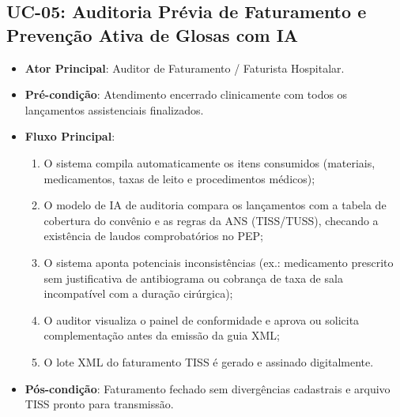 \documentclass[12pt,oneside,a4paper,article]{abntex2}
\begin{document}
\subsection{UC-05: Auditoria Prévia de Faturamento e Prevenção Ativa de Glosas com IA}
\begin{itemize}[noitemsep]
  \item \textbf{Ator Principal}: Auditor de Faturamento / Faturista Hospitalar.
  \item \textbf{Pré-condição}: Atendimento encerrado clinicamente com todos os lançamentos assistenciais finalizados.
  \item \textbf{Fluxo Principal}:
  \begin{enumerate}[noitemsep]
    \item O sistema compila automaticamente os itens consumidos (materiais, medicamentos, taxas de leito e procedimentos médicos);
    \item O modelo de IA de auditoria compara os lançamentos com a tabela de cobertura do convênio e as regras da ANS (TISS/TUSS), checando a existência de laudos comprobatórios no PEP;
    \item O sistema aponta potenciais inconsistências (ex.: medicamento prescrito sem justificativa de antibiograma ou cobrança de taxa de sala incompatível com a duração cirúrgica);
    \item O auditor visualiza o painel de conformidade e aprova ou solicita complementação antes da emissão da guia XML;
    \item O lote XML do faturamento TISS é gerado e assinado digitalmente.
  \end{enumerate}
  \item \textbf{Pós-condição}: Faturamento fechado sem divergências cadastrais e arquivo TISS pronto para transmissão.
\end{itemize}
\end{document}
